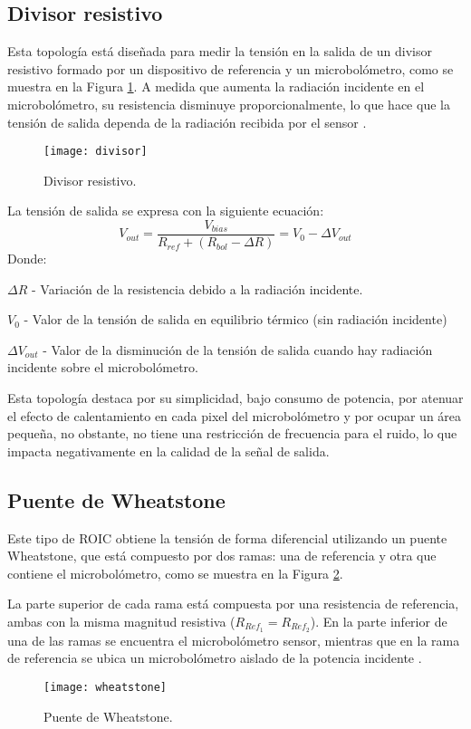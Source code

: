 \subsection{Divisor resistivo} 
Esta topología está diseñada para medir la tensión en la salida de un divisor resistivo formado por un dispositivo de referencia y un microbolómetro, como se muestra en la Figura \ref{fig:divisor}. A medida que aumenta la radiación incidente en el microbolómetro, su resistencia disminuye proporcionalmente, lo que hace que la tensión de salida dependa de la radiación recibida por el sensor \cite{BlancoMDA}.
            \begin{figure}[hbtp]
                \centering
                \texttt{[image: divisor]}
                \caption{Divisor resistivo.}
                \label{fig:divisor}
            \end{figure}

La tensión de salida se expresa con la siguiente ecuación:
        \begin{equation}
        V_{out} =\frac{V_{bias}}{R_{ref} + (R_{bol} - \Delta R)} = V_{0} - \Delta V_{out}
        \label{eq:Divisor}
        \end{equation} 
Donde:


$\Delta R$ - Variación de la resistencia debido a la radiación incidente.


$V_{0}$ - Valor de la tensión de salida en equilibrio térmico (sin radiación incidente)


$\Delta V_{out}$ - Valor de la disminución de la tensión de salida cuando hay radiación incidente sobre el microbolómetro.


Esta topología destaca por su simplicidad, bajo consumo de potencia, por atenuar el efecto de calentamiento en cada pixel del microbolómetro y por ocupar un área pequeña, no obstante, no tiene una restricción de frecuencia para el ruido, lo que impacta negativamente en la calidad de la señal de salida.

\subsection{Puente de Wheatstone}
Este tipo de ROIC obtiene la tensión de forma diferencial utilizando un puente Wheatstone, que está compuesto por dos ramas: una de referencia y otra que contiene el microbolómetro, como se muestra en la Figura \ref{fig:wheatstone}.

La parte superior de cada rama está compuesta por una resistencia de referencia, ambas con la misma magnitud resistiva ($R_{Ref_1} = R_{Ref_2}$). En la parte inferior de una de las ramas se encuentra el microbolómetro sensor, mientras que en la rama de referencia se ubica un microbolómetro aislado de la potencia incidente \cite{BlancoMDA}.
            \begin{figure}[hbtp]
                \centering
                \texttt{[image: wheatstone]}
                \caption{Puente de Wheatstone.}
                \label{fig:wheatstone}
            \end{figure}

